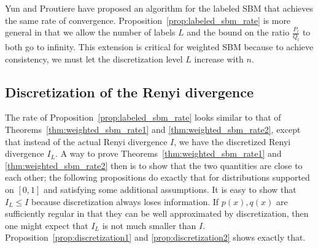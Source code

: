 \documentclass{article}
\begin{document}
Yun and Proutiere \cite{yun2016optimal} have proposed an algorithm for the labeled SBM that achieves the same rate of convergence. Proposition~\ref{prop:labeled_sbm_rate} is more general in that we allow the number of labels $L$ and the bound on the ratio $\frac{P_l}{Q_l}$ to both go to infinity. This extension is critical for weighted SBM because to achieve consistency, we must let the discretization level $L$ increase with $n$. 


\subsection{Discretization of the Renyi divergence}
\label{sec:discretization_analysis}

The rate of Proposition~\ref{prop:labeled_sbm_rate} looks similar to that of Theorems~\ref{thm:weighted_sbm_rate1} and \ref{thm:weighted_sbm_rate2}, except that instead of the actual Renyi divergence $I$, we have the discretized Renyi divergence $I_L$. A way to prove Theorems~\ref{thm:weighted_sbm_rate1} and \ref{thm:weighted_sbm_rate2} then is to show that the two quantities are close to each other; the following propositions do exactly that for distributions supported on $[0,1]$ and satisfying some additional assumptions. It is easy to show that $I_L \leq I$ because discretization always loses information. If $p(x), q(x)$ are sufficiently regular in that they can be well approximated by discretization, then one might expect that $I_L$ is not much smaller than $I$. Proposition~\ref{prop:discretization1} and \ref{prop:discretization2} shows exactly that. 
\medskip
\end{document}
